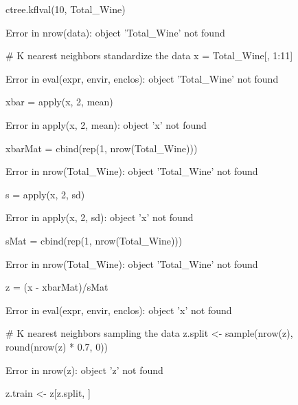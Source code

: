 \documentclass[letterpaper]{article}\usepackage[]{graphicx}\usepackage[]{color}
\begin{document}
\begin{Schunk}
\begin{Sinput}
ctree.kflval(10, Total_Wine)
\end{Sinput}
\begin{Soutput}
Error in nrow(data): object 'Total_Wine' not found
\end{Soutput}
\begin{Sinput}
# K nearest neighbors standardize the data
x = Total_Wine[, 1:11]
\end{Sinput}
\begin{Soutput}
Error in eval(expr, envir, enclos): object 'Total_Wine' not found
\end{Soutput}
\begin{Sinput}
xbar = apply(x, 2, mean)
\end{Sinput}
\begin{Soutput}
Error in apply(x, 2, mean): object 'x' not found
\end{Soutput}
\begin{Sinput}
xbarMat = cbind(rep(1, nrow(Total_Wine))) %*% xbar
\end{Sinput}
\begin{Soutput}
Error in nrow(Total_Wine): object 'Total_Wine' not found
\end{Soutput}
\begin{Sinput}
s = apply(x, 2, sd)
\end{Sinput}
\begin{Soutput}
Error in apply(x, 2, sd): object 'x' not found
\end{Soutput}
\begin{Sinput}
sMat = cbind(rep(1, nrow(Total_Wine))) %*% s
\end{Sinput}
\begin{Soutput}
Error in nrow(Total_Wine): object 'Total_Wine' not found
\end{Soutput}
\begin{Sinput}
z = (x - xbarMat)/sMat
\end{Sinput}
\begin{Soutput}
Error in eval(expr, envir, enclos): object 'x' not found
\end{Soutput}
\begin{Sinput}
# K nearest neighbors sampling the data
z.split <- sample(nrow(z), round(nrow(z) * 0.7, 0))
\end{Sinput}
\begin{Soutput}
Error in nrow(z): object 'z' not found
\end{Soutput}
\begin{Sinput}
z.train <- z[z.split, ]
\end{Sinput}
\begin{Soutput}

\end{Soutput}
\end{Schunk}
\end{document}
